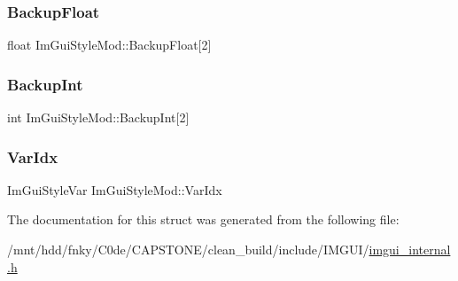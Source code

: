 \subsubsection{\texorpdfstring{Backup\+Float}{BackupFloat}}
{\footnotesize\ttfamily float Im\+Gui\+Style\+Mod\+::\+Backup\+Float\mbox{[}2\mbox{]}}

\mbox{\label{structImGuiStyleMod_a60491c95989b2a866ebb76403a562f6f}} 
\subsubsection{\texorpdfstring{Backup\+Int}{BackupInt}}
{\footnotesize\ttfamily int Im\+Gui\+Style\+Mod\+::\+Backup\+Int\mbox{[}2\mbox{]}}

\mbox{\label{structImGuiStyleMod_ab23c55941dbd0e156ce640a8fecb2feb}} 
\subsubsection{\texorpdfstring{Var\+Idx}{VarIdx}}
{\footnotesize\ttfamily Im\+Gui\+Style\+Var Im\+Gui\+Style\+Mod\+::\+Var\+Idx}



The documentation for this struct was generated from the following file\+:\begin{DoxyCompactItemize}
\item 
/mnt/hdd/fnky/\+C0de/\+C\+A\+P\+S\+T\+O\+N\+E/clean\+\_\+build/include/\+I\+M\+G\+U\+I/\hyperlink{imgui__internal_8h}{imgui\+\_\+internal.\+h}\end{DoxyCompactItemize}

